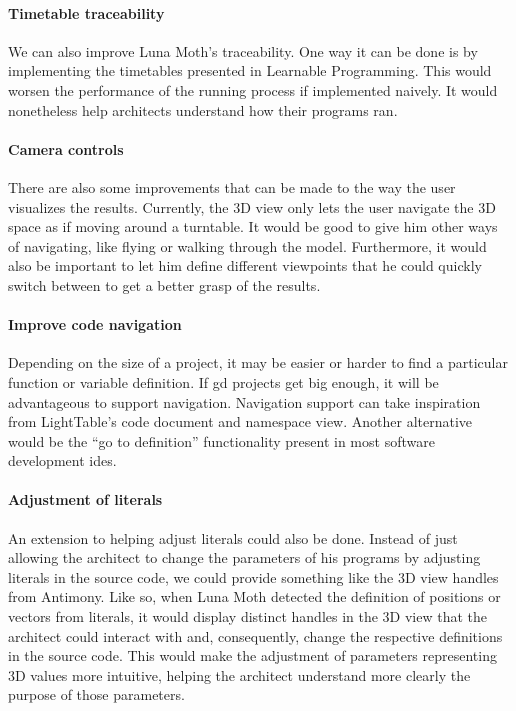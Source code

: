 \paragraph{Timetable traceability}
We can also improve Luna Moth's traceability.
One way it can be done is by implementing the timetables presented in Learnable Programming\cite{victor2012learnable}.
This would worsen the performance of the running process if implemented naively.
It would nonetheless help architects understand how their programs ran.

\paragraph{Camera controls}
There are also some improvements that can be made to the way the user visualizes the results.
Currently, the 3D view only lets the user navigate the 3D space as if moving around a turntable.
It would be good to give him other ways of navigating, like flying or walking through the model.
Furthermore, it would also be important to let him define different viewpoints that he could quickly switch between to get a better grasp of the results.

\paragraph{Improve code navigation}
Depending on the size of a project, it may be easier or harder to find a particular function or variable definition.
If \gls{gd} projects get big enough, it will be advantageous to support navigation.
Navigation support can take inspiration from LightTable's code document and namespace view.
Another alternative would be the ``go to definition'' functionality present in most software development \glspl{ide}.

\paragraph{Adjustment of literals}
An extension to helping adjust literals could also be done.
Instead of just allowing the architect to change the parameters of his programs by adjusting literals in the source code, we could provide something like the 3D view handles from Antimony.
Like so, when Luna Moth detected the definition of positions or vectors from literals, it would display distinct handles in the 3D view that the architect could interact with and, consequently, change the respective definitions in the source code.
This would make the adjustment of parameters representing 3D values more intuitive, helping the architect understand more clearly the purpose of those parameters.


